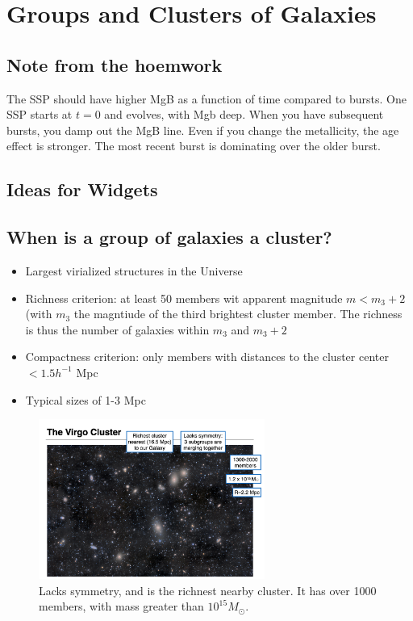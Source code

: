 \documentclass{article}
\begin{document}
\section{Groups and Clusters of Galaxies}

\subsection{Note from the hoemwork}

The SSP should have higher MgB as a function of time compared to bursts. One SSP starts at $t=0$ and evolves, with Mgb deep. When you have subsequent bursts, you damp out the MgB line. Even if you change the metallicity, the age effect is stronger. The most recent burst is dominating over the older burst. 

\subsection{Ideas for Widgets}

\subsection{When is a group of galaxies a cluster?}

\begin{itemize}
    \item Largest virialized structures in the Universe
    \item Richness criterion: at least 50 members wit apparent magnitude $m< m_3 + 2$ (with $m_3$ the magntiude of the third brightest cluster member. The richness is thus the number of galaxies within $m_3$ and $m_3+2$
    \item Compactness criterion: only members with distances to the cluster center $<1.5 h^{-1}$ Mpc
    \item Typical sizes of 1-3 Mpc
\end{itemize}

\begin{figure}
    \centering
    \includegraphics[width=0.66\textwidth]{figs/Screen Shot 2021-10-29 at 10.11.02 AM.png}
    \caption{Lacks symmetry, and is the richnest nearby cluster. It has over 1000 members, with mass greater than $10^{15} M_\odot$. }
    \label{fig:Virgo}
\end{figure}
\end{document}
